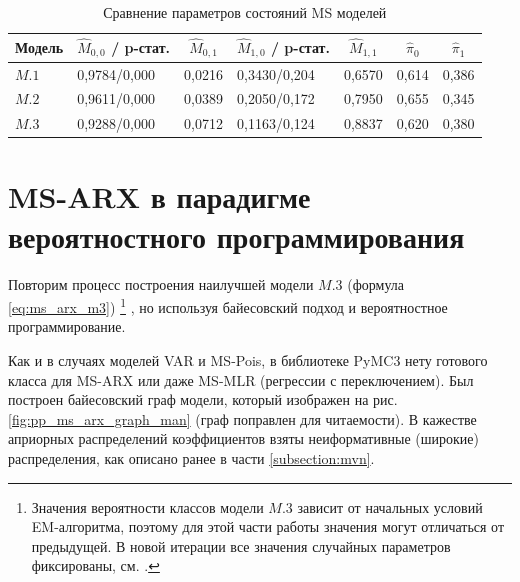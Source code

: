 \documentclass[a4paper,14pt]{extreport}
\begin{document}
\begin{table}[H]
	\begin{tabular}{l|ll|ll|ll}
		\hline
		\multicolumn{1}{c|}{\textbf{Модель}} & \multicolumn{1}{c}{$\hat{M}_{0,0}$ / p-стат.} & \multicolumn{1}{c|}{$\hat{M}_{0,1}$} & \multicolumn{1}{c}{$\hat{M}_{1,0}$ / p-стат.} & \multicolumn{1}{c|}{$\hat{M}_{1,1}$} & \multicolumn{1}{c}{$\hat{\pi}_0$} & \multicolumn{1}{c}{$\hat{\pi}_1$} \\ \hline
		$M.1$                                & 0,9784/0,000                                  & 0,0216                               & 0,3430/0,204                                  & 0,6570                               & 0,614                             & 0,386                             \\
		$M.2$                                & 0,9611/0,000                                  & 0,0389                               & 0,2050/0,172                                  & 0,7950                               & 0,655                             & 0,345                             \\
		$M.3$                                & 0,9288/0,000                                  & 0,0712                               & 0,1163/0,124                                  & 0,8837                               & 0,620                             & 0,380                             \\ \hline
	\end{tabular}
	\caption{Сравнение параметров состояний MS моделей}
	\label{tbl:ggdp_model_params_ms}
\end{table}


\section{MS-ARX в парадигме вероятностного программирования}

\label{section:msarx_pp}

Повторим процесс построения наилучшей модели $M.3$ (формула \eqref{eq:ms_arx_m3}) 
\footnote{Значения вероятности классов модели $M.3$ зависит от начальных условий EM-алгоритма, поэтому для этой части работы значения могут отличаться от предыдущей. В новой итерации все значения случайных параметров фиксированы, см. . }
, но используя байесовский подход и вероятностное программирование. 

Как и в случаях моделей VAR и MS-Pois, в библиотеке PyMC3 нету готового класса для MS-ARX или даже MS-MLR (регрессии с переключением). Был построен байесовский граф модели, который изображен на рис. \ref{fig:pp_ms_arx_graph_man} (граф поправлен для читаемости). В кажестве априорных распределений коэффициентов взяты неиформативные (широкие) распределения, как описано ранее в части \ref{subsection:mvn}.
\end{document}

